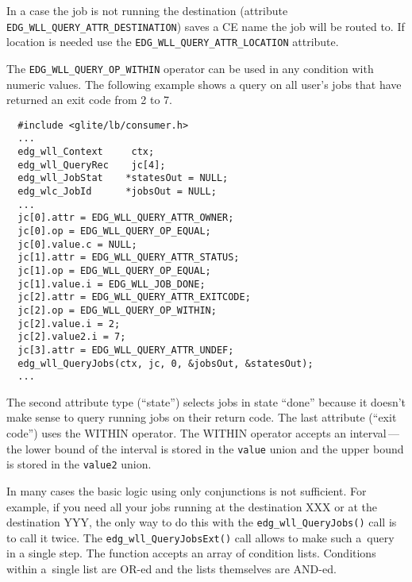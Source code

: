 In a case the job is not running the destination (attribute \texttt{EDG\_WLL\_QUERY\_ATTR\_DESTINATION})
saves a CE name the job will be routed to. If location is needed use the \texttt{EDG\_WLL\_QUERY\_ATTR\_LOCATION} attribute.


The \texttt{EDG\_WLL\_QUERY\_OP\_WITHIN} operator can be used in any condition with numeric values.
The following example shows a query on all user's jobs that have returned 
an exit code from 2 to 7.
\begin{verbatim}
  #include <glite/lb/consumer.h>
  ...
  edg_wll_Context     ctx;    
  edg_wll_QueryRec    jc[4];
  edg_wll_JobStat    *statesOut = NULL;
  edg_wlc_JobId      *jobsOut = NULL;
  ...
  jc[0].attr = EDG_WLL_QUERY_ATTR_OWNER;
  jc[0].op = EDG_WLL_QUERY_OP_EQUAL;
  jc[0].value.c = NULL;
  jc[1].attr = EDG_WLL_QUERY_ATTR_STATUS;
  jc[1].op = EDG_WLL_QUERY_OP_EQUAL;
  jc[1].value.i = EDG_WLL_JOB_DONE;
  jc[2].attr = EDG_WLL_QUERY_ATTR_EXITCODE;
  jc[2].op = EDG_WLL_QUERY_OP_WITHIN;
  jc[2].value.i = 2;
  jc[2].value2.i = 7;
  jc[3].attr = EDG_WLL_QUERY_ATTR_UNDEF;
  edg_wll_QueryJobs(ctx, jc, 0, &jobsOut, &statesOut);
  ...
\end{verbatim}

The second attribute type (``state'') selects jobs in state ``done'' because it doesn't
make sense to query running jobs on their return code.
The last attribute (``exit code'') uses the WITHIN operator. The WITHIN operator accepts an
interval\,---\,the lower bound of the interval is stored in the \texttt{value} union and the
upper bound is stored in the \texttt{value2} union.

\label{JQ-AO}
In many cases the basic logic using only conjunctions is not sufficient.
For example, if you need all your jobs running at the destination XXX or at
the destination YYY, the only way to do this with the \texttt{edg\_wll\_QueryJobs()}
call is to call it twice. The \texttt{edg\_wll\_QueryJobsExt()} call allows to make
such a~query in a single step.
The function accepts an array of condition lists. Conditions within a~single list are
OR-ed and the lists themselves are AND-ed. 

